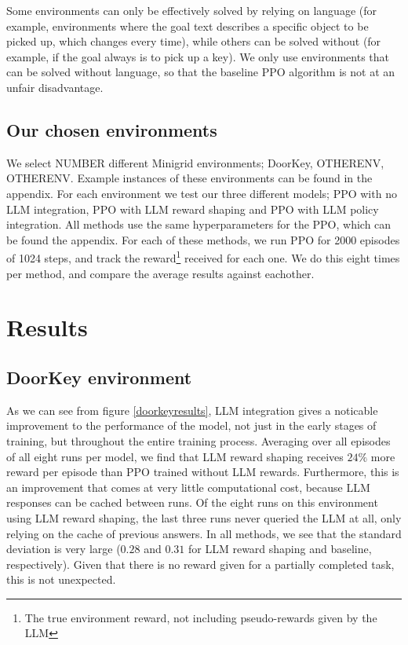 \documentclass[conference]{IEEEtran}
\begin{document}
Some environments can only be effectively solved by relying on language (for example, environments where the goal text describes a specific object to be picked up, which changes every time), while others can be solved without (for example, if the goal always is to pick up a key). We only use environments that can be solved without language, so that the baseline PPO algorithm is not at an unfair disadvantage.

\subsection{Our chosen environments}

We select NUMBER different Minigrid environments; DoorKey, OTHERENV, OTHERENV. Example instances of these environments can be found in the appendix. For each environment we test our three different models; PPO with no LLM integration, PPO with LLM reward shaping and PPO with LLM policy integration. All methods use the same hyperparameters for the PPO, which can be found the appendix. For each of these methods, we run PPO for 2000 episodes of 1024 steps, and track the reward\footnote{The true environment reward, not including pseudo-rewards given by the LLM} received for each one. We do this eight times per method, and compare the average results against eachother.

\section{Results}

\subsection{DoorKey environment}

As we can see from figure \ref{doorkeyresults}, LLM integration gives a noticable improvement to the performance of the model, not just in the early stages of training, but throughout the entire training process. Averaging over all episodes of all eight runs per model, we find that LLM reward shaping receives $24\%$ more reward per episode than PPO trained without LLM rewards. Furthermore, this is an improvement that comes at very little computational cost, because LLM responses can be cached between runs. Of the eight runs on this environment using LLM reward shaping, the last three runs never queried the LLM at all, only relying on the cache of previous answers. In all methods, we see that the standard deviation is very large ($0.28$ and $0.31$ for LLM reward shaping and baseline, respectively). Given that there is no reward given for a partially completed task, this is not unexpected.
\end{document}
